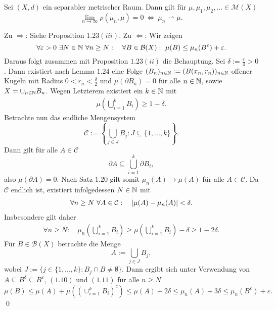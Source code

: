 \begin{theorem}
    Sei $(X,d)$ ein separabler metrischer Raum. Dann gilt für $\mu, \mu_1, \mu_2, ... \in \mathcal{M}(X)$
    $$
        \lim_{n \to \infty} \rho(\mu_n, \mu) = 0 \ \iff \ \mu_n \rightharpoonup \mu.  
    $$
\end{theorem}

\begin{proof*}
    Zu $\Rightarrow$: Siehe Proposition $1.23(iii)$.
    \newline 
    Zu $\Leftarrow$:  Wir zeigen
    $$
        \forall \varepsilon > 0 \ \exists N \in \N \ \forall n \geq N: \quad \forall B \in \mathcal{B}(X): \  \mu(B) \leq \mu_n(B^{\varepsilon}) + \varepsilon. 
    $$
    Daraus folgt zusammen mit Proposition $1.23(ii)$ die Behauptung. Sei $\delta := \frac{\varepsilon}{4} > 0$. 
    Dann existiert nach Lemma $1.24$ eine Folge $(B_n)_{n \in \mathbb{N}} := (B(x_n, r_n))_{n \in \mathbb{N}}$ offener Kugeln mit Radius $0 < r_n < \frac{\delta}{2}$  
    und $\mu(\partial B_n) = 0$ für alle $n \in \mathbb{N}$, sowie $X = \cup_{n \in  \mathbb{N}}B_n$. Wegen Letzterem existiert ein $k \in \mathbb{N}$ mit
    \begin{align}
        \mu\left(\bigcup_{i=1}^k B_i\right) \geq 1 - \delta. 
    \end{align}
    Betrachte nun das endliche Mengensystem 
    $$
        \mathcal{C} := \left\{ \bigcup_{j \in J}B_j : J \subseteq \{1,...,k\}\right\}. 
    $$
    Dann gilt für alle $A \in \mathcal{C}$
    $$
        \partial A \subseteq \bigcup_{i=1}^k \partial B_i,
    $$
    also $\mu(\partial A) = 0$. Nach Satz $1.20$ gilt somit $\mu_n(A) \to \mu(A)$ für alle $A \in \mathcal{C}$. Da $\mathcal{C}$ endlich ist, existiert infolgedessen $N \in \mathbb{N}$ mit
    \begin{align}
        \forall n \geq N \ \forall A \in \mathcal{C}: \quad \left| \mu(A) - \mu_n(A) \right| < \delta. 
    \end{align}
    Insbesondere gilt daher
    \begin{align}
        \forall n \geq N: \quad \mu_n\left(\bigcup_{i=1}^k B_i\right) \geq \mu\left(\bigcup_{i=1}^k B_i\right) - \delta \geq 1 - 2\delta. 
    \end{align}
    Für $B \in \mathcal{B}(X)$ betrachte die Menge 
    $$
        A := \bigcup_{j \in J} B_j,
    $$
    wobei $J := \{j \in \{1,...,k\}: B_j \cap B \neq \emptyset \}$. Dann ergibt sich unter Verwendung von $A \subseteq B^{\delta} \subseteq B^{\varepsilon}$, $(1.10)$ und $(1.11)$ für alle $n \geq N$ 
    $$
        \mu(B) \leq \mu(A) + \mu\left((\cup_{i=1}^k B_i)^c\right) \leq \mu(A) + 2\delta \leq \mu_n(A) + 3\delta \leq \mu_n(B^{\varepsilon}) + \varepsilon. 
    $$
    \qed
    
\end{proof*}
